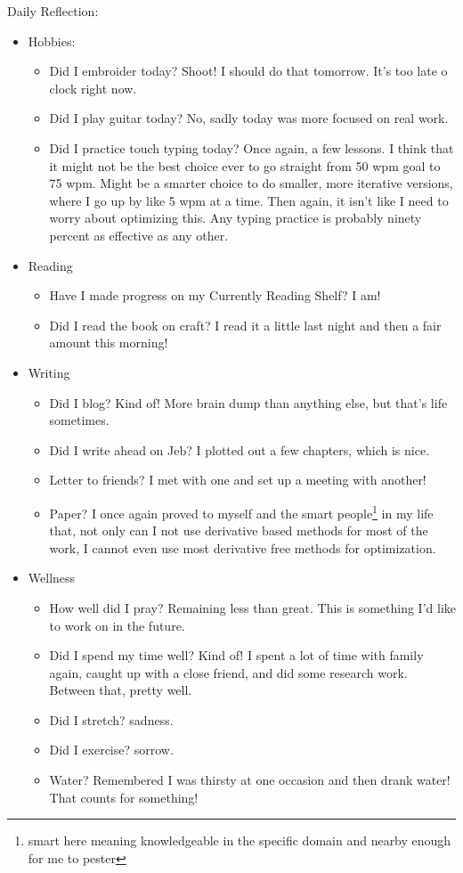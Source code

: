 \documentclass[12pt]{article}[titlepage]
\newcommand{\1}{\={a}}
\newcommand{\2}{\={e}}
\newcommand{\3}{\={\i}}
\newcommand{\4}{\=o}
\newcommand{\5}{\=u}
\newcommand{\6}{\={A}}
\renewcommand{\,}{\textsuperscript{,}}
\begin{document}
Daily Reflection:
\begin{itemize}
\item Hobbies:
\begin{itemize}
\item Did I embroider today? Shoot! I should do that tomorrow. It's too late o clock right now.
\item Did I play guitar today? No, sadly today was more focused on real work.
\item Did I practice touch typing today? Once again, a few lessons. I think that it might not be the best choice ever to go straight from 50 wpm goal to 75 wpm. Might be a smarter choice to do smaller, more iterative versions, where I go up by like 5 wpm at a time. Then again, it isn't like I need to worry about optimizing this. Any typing practice is probably ninety percent as effective as any other.
\end{itemize}
\item Reading
\begin{itemize}
\item Have I made progress on my Currently Reading Shelf? I am!
\item Did I read the book on craft? I read it a little last night and then a fair amount this morning!
\end{itemize}
\item Writing
\begin{itemize}
\item Did I blog? Kind of! More brain dump than anything else, but that's life sometimes.
\item Did I write ahead on Jeb? I plotted out a few chapters, which is nice.
\item Letter to friends? I met with one and set up a meeting with another!
\item Paper? I once again proved to myself and the smart people\footnote{smart here meaning knowledgeable in the specific domain and nearby enough for me to pester} in my life that, not only can I not use derivative based methods for most of the work, I cannot even use most derivative free methods for optimization.
\end{itemize}
\item Wellness
\begin{itemize}
\item How well did I pray? Remaining less than great. This is something I'd like to work on in the future.
\item Did I spend my time well? Kind of! I spent a lot of time with family again, caught up with a close friend, and did some research work. Between that, pretty well.
\item Did I stretch? sadness.
\item Did I exercise? sorrow.
\item Water? Remembered I was thirsty at one occasion and then drank water! That counts for something!
\end{itemize}
\end{itemize}
\end{document}
